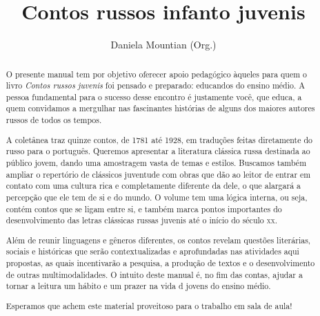 \documentclass[11pt]{extarticle}
\begin{document}
\newcommand{\AutorLivro}{Daniela Mountian (Org.)}
\newcommand{\TituloLivro}{Contos russos infanto juvenis}
\newcommand{\Tema}{Ficção, mistério e fantasia}
\newcommand{\Genero}{Conto, crônica e novela}
\newcommand{\imagemCapa}{./images/PNLD0050-01.png}
\newcommand{\issnppub}{---}
\newcommand{\issnepub}{---}
\newcommand{\colaborador}{\textbf{Marina Darmaros} é uma pessoa incrível e vai fazer um bom serviço.}


\title{\TituloLivro}
\author{\AutorLivro}
\def\authornotes{\colaborador}

\date{}
\maketitle






\begin{abstract}
O presente manual tem por objetivo oferecer apoio pedagógico àqueles
para quem o livro \emph{Contos russos} \emph{juvenis} foi pensado e
preparado: educandos do ensino médio. A pessoa fundamental para o
sucesso desse encontro é justamente você, que educa, a quem convidamos a
mergulhar nas fascinantes histórias de alguns dos maiores autores russos
de todos os tempos.

A coletânea traz quinze contos, de 1781 até 1928, em traduções feitas
diretamente do russo para o português. Queremos apresentar a literatura
clássica russa destinada ao público jovem, dando uma amostragem vasta de
temas e estilos. Buscamos também ampliar o repertório de clássicos
juventude com obras que dão ao leitor de entrar em contato com uma
cultura rica e completamente diferente da dele, o que alargará a
percepção que ele tem de si e do mundo. O volume tem uma lógica interna,
ou seja, contém contos que se ligam entre si, e também marca pontos
importantes do desenvolvimento das letras clássicas russas juvenis até o
início do século \textsc{xx}.

Além de reunir linguagens e gêneros diferentes, os contos revelam
questões literárias, sociais e históricas que serão contextualizadas e
aprofundadas nas atividades aqui propostas, as quais incentivarão a
pesquisa, a produção de textos e o desenvolvimento de outras
multimodalidades. O intuito deste manual é, no fim das contas, ajudar a
tornar a leitura um hábito e um prazer na vida d jovens do ensino médio.

Esperamos que achem este material proveitoso para o trabalho em sala de
aula!

\end{abstract}
\tableofcontents
\end{document}
